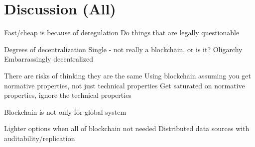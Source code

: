 \section{Discussion (All)}

Fast/cheap is because of deregulation
	Do things that are legally questionable

Degrees of decentralization
	Single - not really a blockchain, or is it?
	Oligarchy
	Embarrassingly decentralized
	
There are risks of thinking they are the same
	Using blockchain assuming you get normative properties, not just technical properties
	Get saturated on normative properties, ignore the technical properties
	
Blockchain is not only for global system

Lighter options when all of blockchain not needed
	Distributed data sources with auditability/replication
	